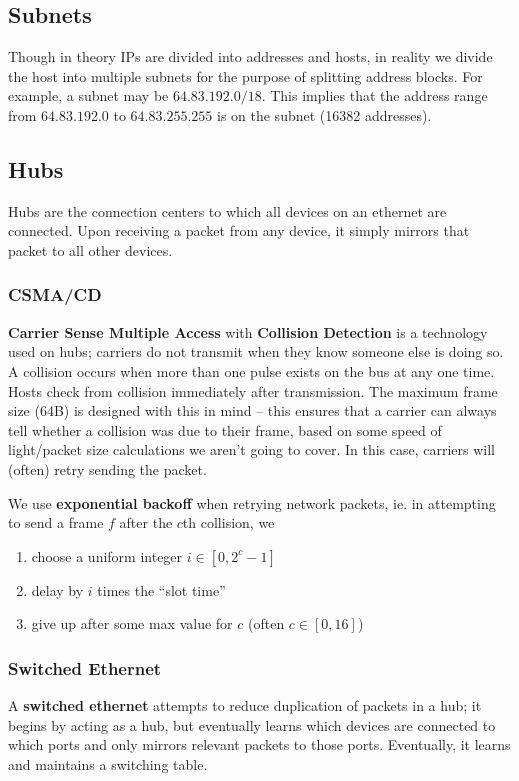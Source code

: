 \documentclass[12pt]{article}
\begin{document}
\subsection{Subnets}
Though in theory IPs are divided into addresses and hosts, in reality we divide the host into multiple subnets for the purpose of splitting address blocks. For example, a subnet may be $64.83.192.0/18$. This implies that the address range from $64.83.192.0$ to $64.83.255.255$ is on the subnet (16382 addresses).

\subsection{Hubs}
Hubs are the connection centers to which all devices on an ethernet are connected. Upon receiving a packet from any device, it simply mirrors that packet to all other devices.

\subsubsection{CSMA/CD}
{\bf Carrier Sense Multiple Access} with {\bf Collision Detection} is a technology used on hubs; carriers do not transmit when they know someone else is doing so. A collision occurs when more than one pulse exists on the bus at any one time. Hosts check from collision immediately after transmission. The maximum frame size (64B) is designed with this in mind -- this ensures that a carrier can always tell whether a collision was due to their frame, based on some speed of light/packet size calculations we aren't going to cover. In this case, carriers will (often) retry sending the packet.

We use {\bf exponential backoff} when retrying network packets, ie. in attempting to send a frame $f$ after the $c$th collision, we
\begin{enumerate}
\item choose a uniform integer $i \in [0, 2^c-1]$
\item delay by $i$ times the ``slot time''
\item give up after some max value for $c$ (often $c \in [0,16]$)
\end{enumerate}

\subsubsection{Switched Ethernet}
A {\bf switched ethernet} attempts to reduce duplication of packets in a hub; it begins by acting as a hub, but eventually learns which devices are connected to which ports and only mirrors relevant packets to those ports. Eventually, it learns and maintains a switching table.
\end{document}
